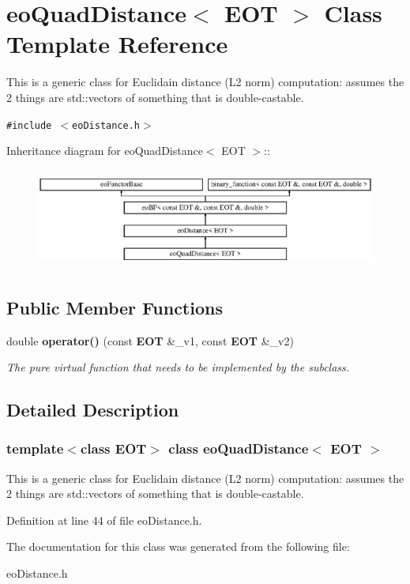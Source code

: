\section{eo\-Quad\-Distance$<$ EOT $>$ Class Template Reference}
\label{classeo_quad_distance}
This is a generic class for Euclidain distance (L2 norm) computation: assumes the 2 things are std::vectors of something that is double-castable.  


{\tt \#include $<$eo\-Distance.h$>$}

Inheritance diagram for eo\-Quad\-Distance$<$ EOT $>$::\begin{figure}[H]
\begin{center}
\leavevmode
\includegraphics[height=3.33333cm]{classeo_quad_distance}
\end{center}
\end{figure}
\subsection*{Public Member Functions}
\begin{CompactItemize}
\item 
double {\bf operator()} (const {\bf EOT} \&\_\-v1, const {\bf EOT} \&\_\-v2)\label{classeo_quad_distance_a0}

\begin{CompactList}\small\item\em The pure virtual function that needs to be implemented by the subclass. \item\end{CompactList}\end{CompactItemize}


\subsection{Detailed Description}
\subsubsection*{template$<$class EOT$>$ class eo\-Quad\-Distance$<$ EOT $>$}

This is a generic class for Euclidain distance (L2 norm) computation: assumes the 2 things are std::vectors of something that is double-castable. 



Definition at line 44 of file eo\-Distance.h.

The documentation for this class was generated from the following file:\begin{CompactItemize}
\item 
eo\-Distance.h\end{CompactItemize}
